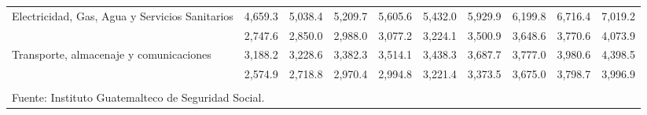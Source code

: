 \begin{landscape}
\begin{center}
\begin{spacing}{1.2}
\begin{tabular}{p{5.5cm}ccccccccc}
				\multicolumn{1}{p{5.5cm}}{	Electricidad, Gas, Agua y Servicios Sanitarios	}&	 4,659.3 	 & 	 5,038.4 	 & 	 5,209.7 	 & 	 5,605.6 	 & 	 5,432.0 	 & 	 5,929.9 	 & 	 6,199.8 	 & 	 6,716.4 	 & 	 7,019.2 	 \\ 
				\rowcolor{color1!5!white}\multicolumn{1}{p{5.5cm}}{	Comercio	}&	 2,747.6 	 & 	 2,850.0 	 & 	 2,988.0 	 & 	 3,077.2 	 & 	 3,224.1 	 & 	 3,500.9 	 & 	 3,648.6 	 & 	 3,770.6 	 & 	 4,073.9 	 \\ 
				\multicolumn{1}{p{5.5cm}}{	Transporte, almacenaje y comunicaciones	}&	 3,188.2 	 & 	 3,228.6 	 & 	 3,382.3 	 & 	 3,514.1 	 & 	 3,438.3 	 & 	 3,687.7 	 & 	 3,777.0 	 & 	 3,980.6 	 & 	 4,398.5 	 \\ 
				\rowcolor{color1!5!white}\multicolumn{1}{p{5.5cm}}{	Servicios	}&	 2,574.9 	 & 	 2,718.8 	 & 	 2,970.4 	 & 	 2,994.8 	 & 	 3,221.4 	 & 	 3,373.5 	 & 	 3,675.0 	 & 	 3,798.7 	 & 	 3,996.9 	 \\ 
				\hline
				&&&&&&&&&\\[-0.36cm]
				\multicolumn{10}{l}{\footnotesize Fuente: Instituto Guatemalteco de Seguridad Social.}\\
			\end{tabular}\addtocounter{Cuadro}{1}
		\end{spacing}
	\end{center}
\end{landscape}





